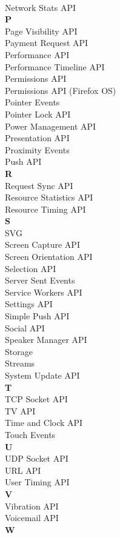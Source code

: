 \begin{multicols}{4}
\\ Network Stats API
\\ \textbf{P}
\\ Page Visibility API
\\ Payment Request API
\\ Performance API
\\ Performance Timeline API
\\ Permissions API
\\ Permissions API (Firefox OS)
\\ Pointer Events
\\ Pointer Lock API
\\ Power Management API
\\ Presentation API 
\\ Proximity Events 
\\ Push API 
\\ \textbf{R}
\\ Request Sync API
\\ Resource Statistics API
\\ Resource Timing API
\\ \textbf{S}
\\ SVG
\\ Screen Capture API
\\ Screen Orientation API
\\ Selection API
\\ Server Sent Events
\\ Service Workers API
\\ Settings API
\\ Simple Push API
\\ Social API
\\ Speaker Manager API
\\ Storage
\\ Streams 
\\ System Update API
\\ \textbf{T}
\\ TCP Socket API
\\ TV API
\\ Time and Clock API
\\ Touch Events
\\ \textbf{U}
\\ UDP Socket API
\\ URL API
\\ User Timing API
\\ \textbf{V}
\\ Vibration API
\\ Voicemail API
\\ \textbf{W}

\end{multicols}
